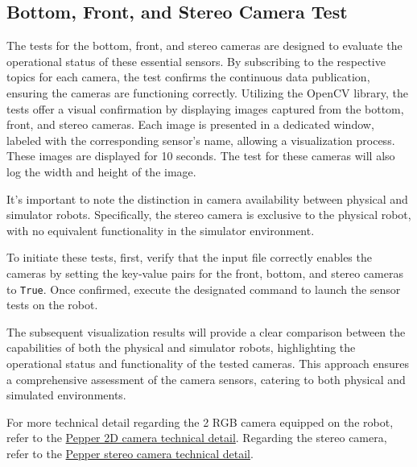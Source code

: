\documentclass{CSSRforAfrica}
\begin{document}
\subsection{Bottom, Front, and Stereo Camera Test}
The tests for the bottom, front, and stereo cameras are designed to evaluate the operational status of these essential sensors. 
By subscribing to the respective topics for each camera, the test confirms the continuous data publication, ensuring the 
cameras are functioning correctly. Utilizing the OpenCV library, the tests offer a visual confirmation by displaying images 
captured from the bottom, front, and stereo cameras. Each image is presented in a dedicated window, labeled with the corresponding 
sensor's name, allowing a visualization process. These images are displayed for 10 seconds. The test for these cameras will also log the 
width and height of the image.

It's important to note the distinction in camera availability between physical and simulator robots. Specifically, the stereo 
camera is exclusive to the physical robot, with no equivalent functionality in the simulator environment.

To initiate these tests, first, verify that the input file correctly enables the cameras by setting the key-value pairs for 
the front, bottom, and stereo cameras to \texttt{True}. Once confirmed, execute the designated command to launch the sensor tests on 
the robot.

The subsequent visualization results will provide a clear comparison between the capabilities of both the physical and simulator 
robots, highlighting the operational status and functionality of the tested cameras. This approach ensures a comprehensive assessment 
of the camera sensors, catering to both physical and simulated environments.

For more technical detail regarding the 2 RGB camera equipped on the robot, refer to the \href{http://doc.aldebaran.com/2-5/family/pepper_technical/video_2D_pep.html#d-camera-pepper}
{Pepper 2D camera technical detail}. Regarding the stereo camera, refer to the \href{http://doc.aldebaran.com/2-5/family/pepper_technical/video_Stereo_pep.html#stereo-camera-pepper}{Pepper 
stereo camera technical detail}.
\end{document}
